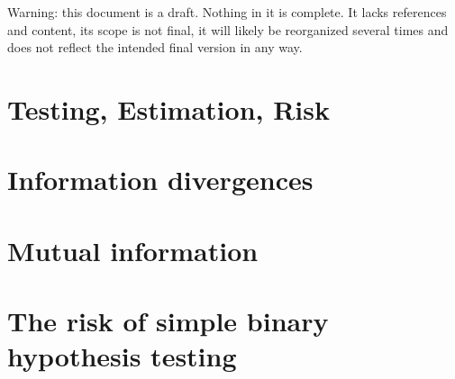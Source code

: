 %

Warning: this document is a draft. Nothing in it is complete. It lacks references and content, its scope is not final, it will likely be reorganized several times and does not reflect the intended final version in any way.



\chapter{Testing, Estimation, Risk}




\chapter{Information divergences}















\chapter{Mutual information}



\chapter{The risk of simple binary hypothesis testing}







\appendix




%